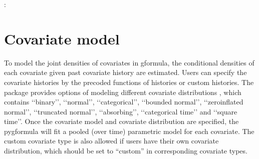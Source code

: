 \documentclass[letterpaper,10pt,english]{sphinxmanual}
\begin{document}
\begin{sphinxVerbatim}[commandchars=\\\{\}]
        
        
       
      \PYG{p}{[} \PYG{p}{[} \PYG{p}{]}\PYG{p}{]}
      
\end{sphinxVerbatim}

\sphinxAtStartPar
{}:
\begin{quote}

\end{quote}


\section{Covariate model}
\label{\detokenize{Specifications/Covariate model:covariate-model}}\label{\detokenize{Specifications/Covariate model:id1}}\label{\detokenize{Specifications/Covariate model::doc}}
\sphinxAtStartPar
To model the joint densities of covariates in g\sphinxhyphen{}formula, the conditional densities of each covariate given past covariate history
are estimated. Users can specify the covariate histories by the pre\sphinxhyphen{}coded functions of histories or custom histories.
The package provides options of modeling different covariate distributions
, which contains ‘‘binary’’, ‘‘normal’’, ‘‘categorical’’, ‘‘bounded normal’’, ‘‘zero\sphinxhyphen{}inflated normal’’, ‘‘truncated normal’’, ‘‘absorbing’’, ‘‘categorical time’’
and ‘‘square time’’.
Once the covariate model and covariate distribution are specified, the pygformula will fit a
pooled (over time) parametric model for each covariate. The custom covariate type is also allowed if users have their own
covariate distribution, which should be set to “custom” in corresponding covariate types.
\end{document}
